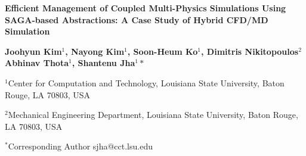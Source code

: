 \documentclass[a4paper]{article}
\begin{document}
\begin{center}


\textbf {\large \bf Efficient Management of Coupled Multi-Physics Simulations
Using SAGA-based Abstractions: A Case Study of  Hybrid CFD/MD Simulation}
\vspace{14pt}

\textbf {\normalsize \hspace{0.6 in} Joohyun Kim$^1$, Nayong Kim$^1$, Soon-Heum Ko$^1$, Dimitris Nikitopoulos$^2$  \newline Abhinav Thota$^1$, Shantenu Jha$^1*$ }

\vspace{12pt}

\normalsize { \hspace{0.6 in} $^1$Center for Computation and Technology, \newline Louisiana State University, Baton Rouge, LA 70803, USA}

\normalsize {\hspace{0.6 in} $^2$Mechanical Engineering Department, \newline Louisiana State University, Baton Rouge, LA 70803, USA}

\vspace{0.2in}
\footnotesize {\hspace{0.0 in} $^*$Corresponding Author sjha@cct.lsu.edu}


\vspace{12pt}

\end{center}
\end{document}
